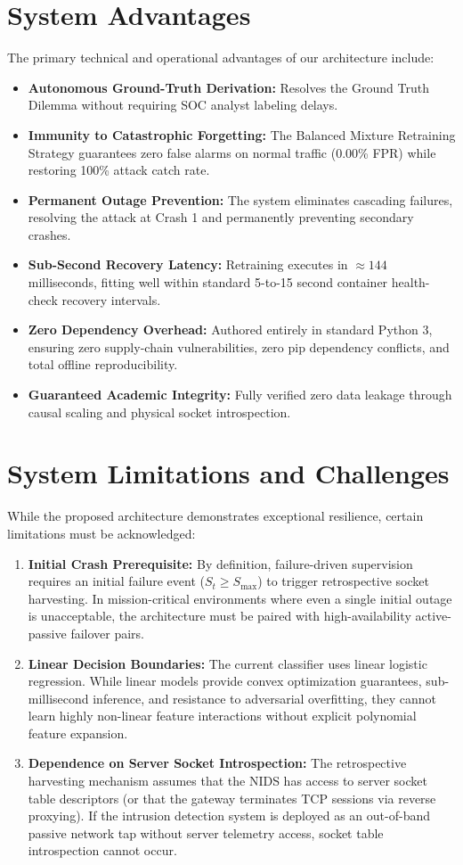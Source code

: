\documentclass[12pt,a4paper,oneside]{report}
\begin{document}
\section{System Advantages}
The primary technical and operational advantages of our architecture include:
\begin{itemize}
    \item \textbf{Autonomous Ground-Truth Derivation:} Resolves the Ground Truth Dilemma without requiring SOC analyst labeling delays.
    \item \textbf{Immunity to Catastrophic Forgetting:} The Balanced Mixture Retraining Strategy guarantees zero false alarms on normal traffic (0.00\% FPR) while restoring 100\% attack catch rate.
    \item \textbf{Permanent Outage Prevention:} The system eliminates cascading failures, resolving the attack at Crash 1 and permanently preventing secondary crashes.
    \item \textbf{Sub-Second Recovery Latency:} Retraining executes in $\approx 144$ milliseconds, fitting well within standard 5-to-15 second container health-check recovery intervals.
    \item \textbf{Zero Dependency Overhead:} Authored entirely in standard Python 3, ensuring zero supply-chain vulnerabilities, zero pip dependency conflicts, and total offline reproducibility.
    \item \textbf{Guaranteed Academic Integrity:} Fully verified zero data leakage through causal scaling and physical socket introspection.
\end{itemize}

\section{System Limitations and Challenges}
While the proposed architecture demonstrates exceptional resilience, certain limitations must be acknowledged:
\begin{enumerate}
    \item \textbf{Initial Crash Prerequisite:} By definition, failure-driven supervision requires an initial failure event ($S_t \ge S_{\max}$) to trigger retrospective socket harvesting. In mission-critical environments where even a single initial outage is unacceptable, the architecture must be paired with high-availability active-passive failover pairs.
    \item \textbf{Linear Decision Boundaries:} The current classifier uses linear logistic regression. While linear models provide convex optimization guarantees, sub-millisecond inference, and resistance to adversarial overfitting, they cannot learn highly non-linear feature interactions without explicit polynomial feature expansion.
    \item \textbf{Dependence on Server Socket Introspection:} The retrospective harvesting mechanism assumes that the NIDS has access to server socket table descriptors (or that the gateway terminates TCP sessions via reverse proxying). If the intrusion detection system is deployed as an out-of-band passive network tap without server telemetry access, socket table introspection cannot occur.
\end{enumerate}
\end{document}
